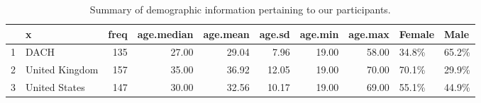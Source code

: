 \begin{table}[ht]
\centering
\begin{tabular}{rlrrrrrrll}
  \hline
 & x & freq & age.median & age.mean & age.sd & age.min & age.max & Female & Male \\ 
  \hline
1 & DACH & 135 & 27.00 & 29.04 & 7.96 & 19.00 & 58.00 & 34.8\% & 65.2\% \\ 
  2 & United Kingdom & 157 & 35.00 & 36.92 & 12.05 & 19.00 & 70.00 & 70.1\% & 29.9\% \\ 
  3 & United States & 147 & 30.00 & 32.56 & 10.17 & 19.00 & 69.00 & 55.1\% & 44.9\% \\ 
   \hline
\end{tabular}
\caption{Summary of demographic information pertaining to our participants. } 
\label{demographic_overview_table}
\end{table}
